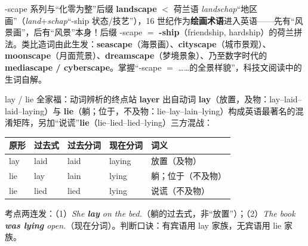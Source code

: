 \documentclass[../main.tex]{subfiles}
\begin{document}
\begin{gram}{-scape 系列与“化零为整”后缀}
\textbf{landscape} $<$ 荷兰语 \textit{landschap}“地区画”（\textit{land}+\textit{schap}“-ship 状态/技艺”），16 世纪作为\textbf{绘画术语}进入英语——先有“风景画”，后有“风景”本身！后缀 -scape $=$ \textbf{-ship}（friendship, hardship）的荷兰拼法。类比造词由此生发：\textbf{seascape}（海景画）、\textbf{cityscape}（城市景观）、\textbf{moonscape}（月面荒景）、\textbf{dreamscape}（梦境景象）、乃至数字时代的 \textbf{mediascape / cyberscape}。掌握“-scape $=$ ……的全景样貌”，科技文阅读中的生词自解。
\end{gram}





\begin{gram}{lay / lie 全家福：动词辨析的终点站}
\textbf{layer} 出自动词 \textbf{lay}（放置，及物：lay--laid--laid--laying）与 \textbf{lie}（躺；位于，不及物：lie--lay--lain--lying）构成英语最著名的混淆矩阵，另加“说谎”\textbf{lie}（lie--lied--lied--lying）三方混战：
\begin{center}
\begin{tabular}{lllll}
\toprule
原形 & 过去式 & 过去分词 & 现在分词 & 词义 \\
\midrule
lay & laid & laid & laying & 放置（及物） \\
lie & lay & lain & lying & 躺；位于（不及物） \\
lie & lied & lied & lying & 说谎（不及物） \\
\bottomrule
\end{tabular}
\end{center}
考点两连发：（1）\textit{She \textbf{lay} on the bed.}（躺的过去式，非“放置”）；（2）\textit{The book \textbf{was lying} open.}（现在分词）。判断口诀：有宾语用 lay 家族，无宾语用 lie 家族。
\end{gram}
\end{document}
